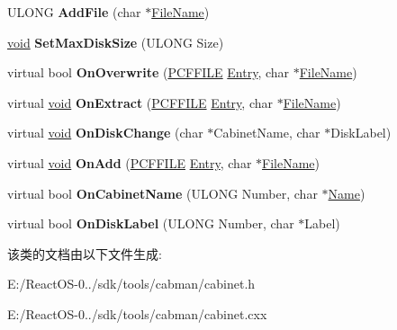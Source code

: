 \begin{DoxyCompactItemize}
\item 
\mbox{\label{class_c_cabinet_ace0b6aa5555d4c935b9028e96d25871f}} 
U\+L\+O\+NG {\bfseries Add\+File} (char $\ast$\hyperlink{struct___file_name}{File\+Name})
\item 
\mbox{\label{class_c_cabinet_a015cbbf02110bde3aa4c1253e3ecd318}} 
\hyperlink{interfacevoid}{void} {\bfseries Set\+Max\+Disk\+Size} (U\+L\+O\+NG Size)
\item 
\mbox{\label{class_c_cabinet_af00cfb254d9b3a273fdad1ba779e909a}} 
virtual bool {\bfseries On\+Overwrite} (\hyperlink{struct___c_f_f_i_l_e}{P\+C\+F\+F\+I\+LE} \hyperlink{struct_entry}{Entry}, char $\ast$\hyperlink{struct___file_name}{File\+Name})
\item 
\mbox{\label{class_c_cabinet_aa25824f8c1b18e3162818be810aa1cfe}} 
virtual \hyperlink{interfacevoid}{void} {\bfseries On\+Extract} (\hyperlink{struct___c_f_f_i_l_e}{P\+C\+F\+F\+I\+LE} \hyperlink{struct_entry}{Entry}, char $\ast$\hyperlink{struct___file_name}{File\+Name})
\item 
\mbox{\label{class_c_cabinet_a6bf72c85027a29fc274d372db81e12da}} 
virtual \hyperlink{interfacevoid}{void} {\bfseries On\+Disk\+Change} (char $\ast$Cabinet\+Name, char $\ast$Disk\+Label)
\item 
\mbox{\label{class_c_cabinet_ae1fe10d126dced7a1e1f1feab130b9ba}} 
virtual \hyperlink{interfacevoid}{void} {\bfseries On\+Add} (\hyperlink{struct___c_f_f_i_l_e}{P\+C\+F\+F\+I\+LE} \hyperlink{struct_entry}{Entry}, char $\ast$\hyperlink{struct___file_name}{File\+Name})
\item 
\mbox{\label{class_c_cabinet_afd52ad9100cacb61135b74eb4602159f}} 
virtual bool {\bfseries On\+Cabinet\+Name} (U\+L\+O\+NG Number, char $\ast$\hyperlink{struct_name_rec__}{Name})
\item 
\mbox{\label{class_c_cabinet_af48a3da054242643ebdb28aba6bdc42b}} 
virtual bool {\bfseries On\+Disk\+Label} (U\+L\+O\+NG Number, char $\ast$Label)
\end{DoxyCompactItemize}


该类的文档由以下文件生成\+:\begin{DoxyCompactItemize}
\item 
E\+:/\+React\+O\+S-\/0../sdk/tools/cabman/cabinet.\+h\item 
E\+:/\+React\+O\+S-\/0../sdk/tools/cabman/cabinet.\+cxx\end{DoxyCompactItemize}
